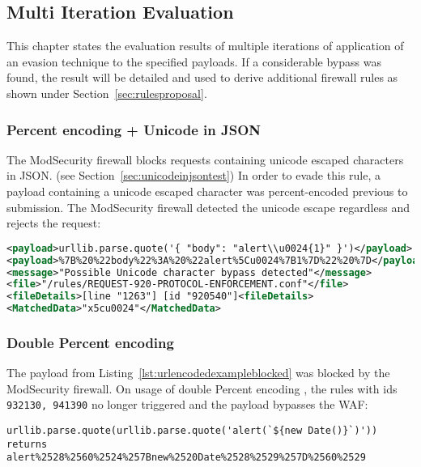 \subsection{Multi Iteration Evaluation}
\label{sec:multiiteration}
This chapter states the evaluation results of multiple iterations of application of an evasion technique to the specified payloads. If a considerable bypass was found, the result will be detailed and used to derive additional firewall rules as shown under Section~\ref{sec:rulesproposal}.


\subsubsection{Percent encoding + Unicode in JSON}
The ModSecurity firewall blocks requests containing unicode escaped characters in JSON. (see Section~\ref{sec:unicodeinjsontest})
In order to evade this rule, a payload containing a unicode escaped character was percent-encoded previous to submission.
The ModSecurity firewall detected the unicode escape regardless and rejects the request:

\begin{lstlisting}[style=ruleStyle, language=XML, caption=unicode escape in json with additional percent encoding, label={lst:jsonunicodeurlenctest}]
<payload>urllib.parse.quote('{ "body": "alert\\u0024{1}" }')</payload>
<payload>%7B%20%22body%22%3A%20%22alert%5Cu0024%7B1%7D%22%20%7D</payload>
<message>"Possible Unicode character bypass detected"</message>
<file>"/rules/REQUEST-920-PROTOCOL-ENFORCEMENT.conf"</file>
<fileDetails>[line "1263"] [id "920540"]<fileDetails>
<MatchedData>"x5cu0024"</MatchedData>
\end{lstlisting}


\subsubsection{Double Percent encoding}
\label{sec:doublepercenc}
The payload from Listing~\ref{lst:urlencodedexampleblocked} was blocked by the ModSecurity firewall.
On usage of double Percent encoding , the rules with ids \verb|932130, 941390| no longer triggered and the payload bypasses the WAF:

\begin{lstlisting}[style=basicStyle, caption=url encoded example pass, label={lst:doublepercentencoding}]
urllib.parse.quote(urllib.parse.quote('alert(`${new Date()}`)'))
returns
alert%2528%2560%2524%257Bnew%2520Date%2528%2529%257D%2560%2529
\end{lstlisting}

